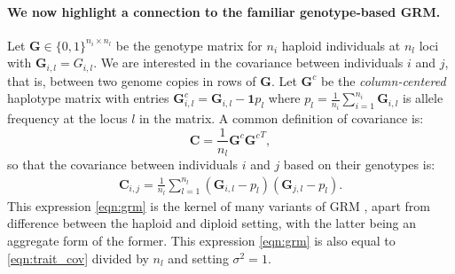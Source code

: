 \paragraph{We now highlight a connection to the familiar genotype-based GRM.}
%
Let $\mathbf{G} \in \{0, 1\}^{n_i \times n_l}$ be the genotype matrix
for $n_i$ haploid individuals at $n_l$ loci with 
$\mathbf{G}_{i,l}=G_{i,l}$.
%
We are interested in the covariance between individuals $i$ and $j$,
that is, between two genome copies in rows of $\mathbf{G}$.
%
Let $\mathbf{G}^c$ be the \textit{column-centered} haplotype matrix with
entries $\mathbf{G}^c_{i,l} = \mathbf{G}_{i,l} - \mathbf{1}p_l$ where
$p_l = \frac{1}{n_i}\sum_{i=1}^{n_i} \mathbf{G}_{i,l}$ is allele frequency
at the locus $l$ in the matrix.
%
A common definition of covariance is:
%
\[ \mathbf{C} = \frac{1}{n_l}\mathbf{G}^c{\mathbf{G}^c}^T, \]
%
so that the covariance between individuals $i$ and $j$ based on their genotypes is:
%
\begin{align} \label{eqn:grm} %
    \mathbf{C}_{i,j} = \frac{1}{n_l} \sum_{l=1}^{n_l} (\mathbf{G}_{i,l} - p_l)(\mathbf{G}_{j,l} - p_l).
\end{align}
%
This expression \eqref{eqn:grm} is the kernel of many variants of GRM
\citep{vanraden2008efficient, yang2010common, speed2015relatedness},
apart from difference between the haploid and diploid setting,
with the latter being an aggregate form of the former.
%
This expression \eqref{eqn:grm} is also equal to \eqref{eqn:trait_cov}
divided by $n_l$ and setting $\sigma^2=1$.


